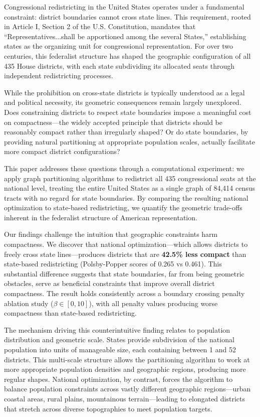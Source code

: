 
Congressional redistricting in the United States operates under a fundamental constraint: district boundaries cannot cross state lines. This requirement, rooted in Article I, Section 2 of the U.S. Constitution, mandates that ``Representatives...shall be apportioned among the several States,'' establishing states as the organizing unit for congressional representation. For over two centuries, this federalist structure has shaped the geographic configuration of all 435 House districts, with each state subdividing its allocated seats through independent redistricting processes.

While the prohibition on cross-state districts is typically understood as a legal and political necessity, its geometric consequences remain largely unexplored. Does constraining districts to respect state boundaries impose a meaningful cost on compactness---the widely accepted principle that districts should be reasonably compact rather than irregularly shaped? Or do state boundaries, by providing natural partitioning at appropriate population scales, actually facilitate more compact district configurations?

This paper addresses these questions through a computational experiment: we apply graph partitioning algorithms to redistrict all 435 congressional seats at the national level, treating the entire United States as a single graph of 84,414 census tracts with no regard for state boundaries. By comparing the resulting national optimization to state-based redistricting, we quantify the geometric trade-offs inherent in the federalist structure of American representation.

Our findings challenge the intuition that geographic constraints harm compactness. We discover that national optimization---which allows districts to freely cross state lines---produces districts that are \textbf{42.5\% less compact} than state-based redistricting (Polsby-Popper scores of 0.265 vs 0.461). This substantial difference suggests that state boundaries, far from being geometric obstacles, serve as beneficial constraints that improve overall district compactness. The result holds consistently across a boundary crossing penalty ablation study ($ \beta \in [0, 10] $), with all penalty values producing worse compactness than state-based redistricting.

The mechanism driving this counterintuitive finding relates to population distribution and geometric scale. States provide subdivision of the national population into units of manageable size, each containing between 1 and 52 districts. This multi-scale structure allows the partitioning algorithm to work at more appropriate population densities and geographic regions, producing more regular shapes. National optimization, by contrast, forces the algorithm to balance population constraints across vastly different geographic regions---urban coastal areas, rural plains, mountainous terrain---leading to elongated districts that stretch across diverse topographies to meet population targets.

